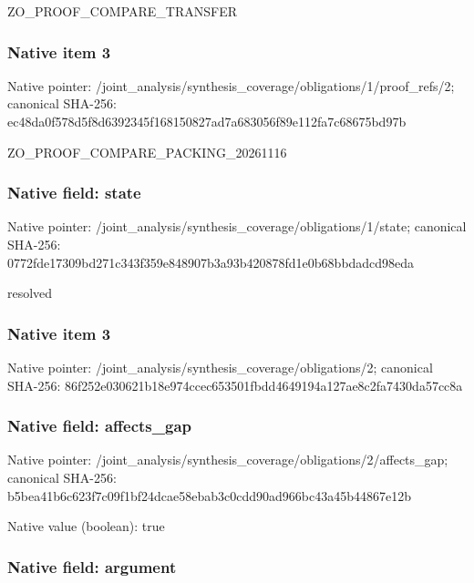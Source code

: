 \documentclass[10pt,a4paper]{article}
\begin{document}
ZO\_PROOF\_COMPARE\_TRANSFER


\subsubsection{Native item 3}


Native pointer: /joint\_analysis/synthesi\allowbreak{}s\_coverage/obligations/1\allowbreak{}/proof\_refs/2; canonical SHA-256: ec48da0f578d5f8d6392345f\allowbreak{}168150827ad7a683056f89e1\allowbreak{}12fa7c68675bd97b


ZO\_PROOF\_COMPARE\_PACKING\_20261116


\subsubsection{Native field: state}


Native pointer: /joint\_analysis/synthesi\allowbreak{}s\_coverage/obligations/1\allowbreak{}/state; canonical SHA-256: 0772fde17309bd271c343f35\allowbreak{}9e848907b3a93b420878fd1e\allowbreak{}0b68bbdadcd98eda


resolved


\subsubsection{Native item 3}


Native pointer: /joint\_analysis/synthesi\allowbreak{}s\_coverage/obligations/2; canonical SHA-256: 86f252e030621b18e974ccec\allowbreak{}653501fbdd4649194a127ae8\allowbreak{}c2fa7430da57cc8a



\subsubsection{Native field: affects\_gap}


Native pointer: /joint\_analysis/synthesi\allowbreak{}s\_coverage/obligations/2\allowbreak{}/affects\_gap; canonical SHA-256: b5bea41b6c623f7c09f1bf24\allowbreak{}dcae58ebab3c0cdd90ad966b\allowbreak{}c43a45b44867e12b



Native value (boolean): true



\subsubsection{Native field: argument}
\end{document}
